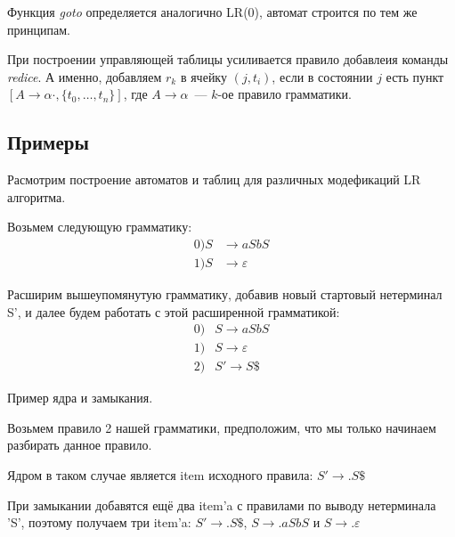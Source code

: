 Функция \textit{goto} определяется аналогично LR(0), автомат строится по тем же принципам.

При построении управляющей таблицы усиливается правило добавлеия команды \textit{redice}.
А именно, добавляем $r_k$ в ячейку $(j,t_i)$, если в состоянии $j$ есть пункт $[A \to \alpha \cdot, \{t_0, \dots, t_n\}]$, где $A \to \alpha$~--- $k$-ое правило грамматики.

\subsection{Примеры}

Расмотрим построение автоматов и таблиц для различных модефикаций LR алгоритма.

Возьмем следующую грамматику:
\begin{align*}
0) S & \rightarrow a S b S \\
1) S & \rightarrow \varepsilon
\end{align*}

Расширим вышеупомянутую грамматику, добавив новый стартовый нетерминал S', и далее будем работать с этой расширенной грамматикой:
\begin{align*}
0) & S \rightarrow a S b S \\
1) & S \rightarrow \varepsilon \\
2) & S' \rightarrow S \$
\end{align*}


\begin{example}
Пример ядра и замыкания.

Возьмем правило 2 нашей грамматики, предположим, что мы только начинаем разбирать данное правило.

Ядром в таком случае является item исходного правила: $S' \rightarrow .S \$$

При замыкании добавятся ещё два item'a с правилами по выводу нетерминала 'S', поэтому получаем три item'a: $S' \rightarrow .S\$$, $S \rightarrow .aSbS$ и $S \rightarrow .\varepsilon$
\end{example}

